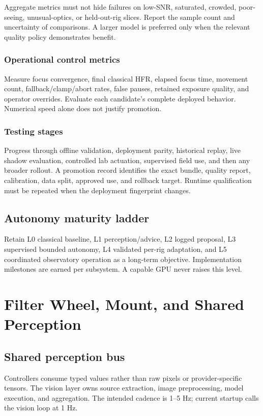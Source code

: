 \documentclass[11pt,a4paper]{article}
\newcommand{\code}[1]{\texttt{\detokenize{#1}}}
\begin{document}
Aggregate metrics must not hide failures on low-SNR, saturated, crowded,
poor-seeing, unusual-optics, or held-out-rig slices\cite{hidden}. Report the
sample count and uncertainty of comparisons. A larger model is preferred only
when the relevant quality policy demonstrates benefit.

\subsubsection{Operational control metrics}
Measure focus convergence, final classical HFR, elapsed focus time, movement
count, fallback/clamp/abort rates, false pauses, retained exposure quality,
and operator overrides. Evaluate each candidate's complete deployed behavior.
Numerical speed alone does not justify promotion.

\subsubsection{Testing stages}
Progress through offline validation, deployment parity, historical replay,
live shadow evaluation, controlled lab actuation, supervised field use, and
then any broader rollout. A promotion record identifies the exact bundle,
quality report, calibration, data split, approved use, and rollback target.
Runtime qualification must be repeated when the deployment fingerprint changes.

\subsection{Autonomy maturity ladder}
Retain L0 classical baseline, L1 perception/advice, L2 logged proposal,
L3 supervised bounded autonomy, L4 validated per-rig adaptation, and L5
coordinated observatory operation as a long-term objective. Implementation
milestones are earned per subsystem. A capable GPU never raises this level.

\section{Filter Wheel, Mount, and Shared Perception}
\subsection{Shared perception bus}
Controllers consume typed \code{SharedObservation} values rather than raw
pixels or provider-specific tensors. The vision layer owns source extraction,
image preprocessing, model execution, and aggregation. The intended cadence
is 1--5 Hz; current startup calls the vision loop at 1 Hz.
\end{document}
